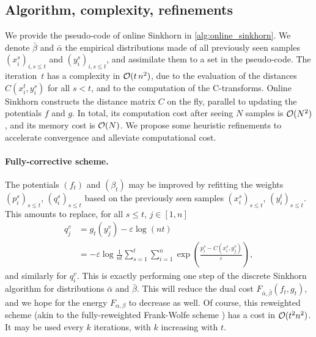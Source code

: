 \subsection{Algorithm, complexity, refinements}

We provide the pseudo-code of online Sinkhorn in \autoref{alg:online_sinkhorn}.
We denote $\bar \beta$ and $\bar \alpha$ the empirical distributions made of all
previously seen samples $(x_i^s)_{i, s \leq t}$ and $(y_i^s)_{i, s \leq t}$, and
assimilate them to a set in the pseudo-code. The iteration~$t$ has a complexity in $\mathcal{O}(t\,n^2)$,
due to the evaluation of the distances $C(x_i^t, y_i^s)$ for all $s < t$, and to
the computation of the C-transforms. Online Sinkhorn constructs the distance
matrix $C$ on the fly, parallel to updating the potentials $f$ and $g$. In
total, its computation cost after seeing $N$ samples is $\mathcal{O}(N^2)$, and its
memory cost is $\mathcal{O}(N)$. We propose some heuristic refinements to accelerate convergence and alleviate computational cost.


\paragraph{Fully-corrective scheme.} The potentials $(f_t)$ and $(\beta_t)$ may be
improved by refitting the weights $(p_i^s)_{s\leq t}$, $(q_i^s)_{s\leq t}$ based
on the previously seen samples $(x_i^s)_{s\leq t}$, $(y_i^t)_{s\leq t}$. This
amounts to replace, for all $s \leq t$, $j \in [1, n]$
\begin{align}
    q_j^v &= g_t(y_j^v) - \varepsilon \log(n t) \\
    &= - \varepsilon \log \frac{1}{nt} \sum_{s=1}^t 
    \sum_{i=1}^n \exp(\frac{p_i^s - C(x_i^s, y_j^v)}{\varepsilon}),
\end{align}
and similarly for $q_i^v$. This is exactly performing one step of the discrete Sinkhorn
 algorithm for distributions $\bar \alpha$ and $\bar \beta$. This will reduce the dual cost
 $F_{ \bar \alpha, \bar \beta}(f_t, g_t)$, and we hope for the energy $F_{\alpha,
 \beta}$ to decrease as well. Of course, this reweighted scheme (akin to the
 fully-reweighted Frank-Wolfe scheme \cite{}) has a cost in $\mathcal{O}(t^2 n^2)$. It
 may be used every $k$ iterations, with $k$ increasing with $t$.

